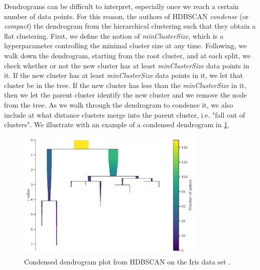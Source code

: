 Dendrograms can be difficult to interpret, especially once we reach a certain number of data points. For this reason, the authors of HDBSCAN \textit{condense} (or \textit{compact}) the dendrogram from the hierarchical clustering such that they obtain a flat clustering. First, we define the notion of \textit{minClusterSize}, which is a hyperparameter controlling the minimal cluster size at any time. Following, we walk down the dendrogram, starting from the root cluster, and at each split, we check whether or not the new cluster has at least \textit{minClusterSize} data points in it. If the new cluster has at least \textit{minClusterSize} data points in it, we let that cluster be in the tree. If the new cluster has less than the \textit{minClusterSize} in it, then we let the parent cluster identify the new cluster and we remove the node from the tree. As we walk through the dendrogram to condense it, we also include at what distance clusters merge into the parent cluster, i.e. "fall out of clusters". We illustrate with an example of a condensed dendrogram in \cref{fig:hdbscan-condensed-dendrogram-example}.
\begin{figure}[H]
    \centering
    \includegraphics[width=0.8\textwidth]{thesis/figures/hdbscan-condensed-tree-example.pdf}
    \caption{Condensed dendrogram plot from HDBSCAN on the Iris data set \cite{Anderson1936,Fisher1936}.}
    \label{fig:hdbscan-condensed-dendrogram-example}
\end{figure}


